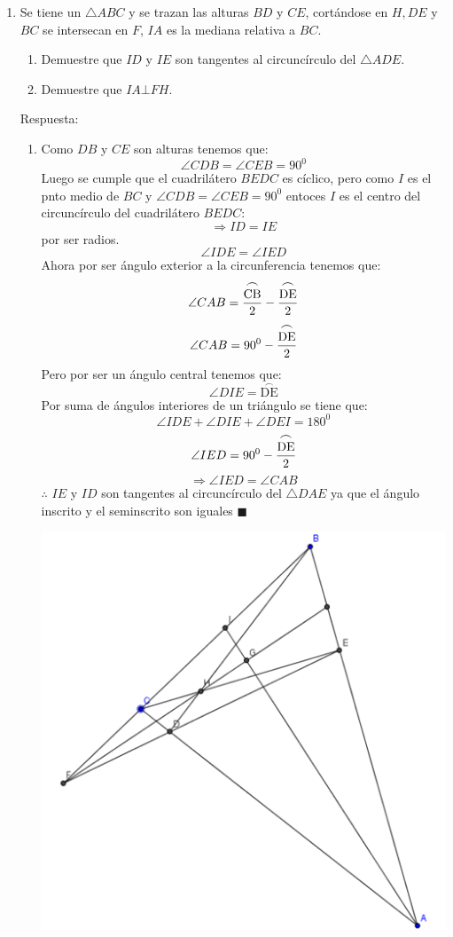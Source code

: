 \documentclass{book}
\begin{document}
\begin{enumerate}
        \item Se tiene un $\triangle ABC$ y se trazan las alturas $BD$ y $CE$, cortándose en $H,DE$ y $BC$ se intersecan en $F$, $IA$ es la mediana relativa a $BC$.
        \begin{enumerate}
            \item Demuestre que $ID$ y $IE$ son tangentes al circuncírculo del $\triangle ADE$.
            \item Demuestre que $IA \bot FH$.
        \end{enumerate}
        Respuesta:
        \begin{enumerate}
            \item Como $DB$ y $CE$ son alturas tenemos que:
            $$\angle CDB=\angle CEB=90^0$$
            Luego se cumple que el cuadrilátero $BEDC$ es cíclico, pero como $I$ es el pnto medio de $BC$ y $\angle CDB=\angle CEB=90^0$ entoces $I$ es el centro del circuncírculo del cuadrilátero $BEDC$:
            $$\Rightarrow ID=IE$$
            por ser radios.
            $$\angle IDE=\angle IED$$
            Ahora por ser ángulo exterior a la circunferencia tenemos que:
            $$\angle CAB={\stackrel{\textstyle\frown}{\mathrm{CB}}\over 2}-{\stackrel{\textstyle\frown}{\mathrm{DE}}\over 2}$$
            $$\angle CAB=90^0-{\stackrel{\textstyle\frown}{\mathrm{DE}}\over 2}$$
            Pero por ser un ángulo central tenemos que:
            $$\angle DIE=\stackrel{\textstyle\frown}{\mathrm{DE}}$$
            Por suma de ángulos interiores de un triángulo se tiene que:
            $$\angle IDE+\angle DIE+\angle DEI=180^0$$
            $$\angle IED=90^0-{\stackrel{\textstyle\frown}{\mathrm{DE}}\over 2}$$
            $$\Rightarrow\angle IED=\angle CAB$$
            $\therefore$ $IE$ y $ID$ son tangentes al circuncírculo del $\triangle DAE$ ya que el ángulo inscrito y el seminscrito son iguales $\blacksquare$
            \begin{center}
                \includegraphics[scale=1]{imagenes/Geometria/23.png}

\end{center}
\end{enumerate}
\end{enumerate}
\end{document}
